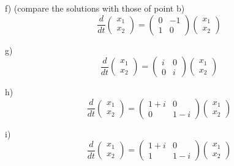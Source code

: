 f) (compare the solutions with those of point b)
\begin{equation}
  \label{eq:prob5_2f}
  \frac{d}{dt}\left(
    \begin{array}{c}
      x_1 \\ x_2
    \end{array}
  \right) = 
    \left(
      \begin{array}{cc}
        0 & -1 \\ 1 & 0
      \end{array}
    \right) \left(
      \begin{array}{c}
        x_1 \\ x_2
      \end{array}
      \right)
\end{equation}

g) 
\begin{equation}
  \label{eq:prob5_2g}
  \frac{d}{dt}\left(
    \begin{array}{c}
      x_1 \\ x_2
    \end{array}
  \right) = 
    \left(
      \begin{array}{cc}
        i & 0 \\ 0 & i
      \end{array}
    \right) \left(
      \begin{array}{c}
        x_1 \\ x_2
      \end{array}
      \right)
\end{equation}

h) 
\begin{equation}
  \label{eq:prob5_2h}
  \frac{d}{dt}\left(
    \begin{array}{c}
      x_1 \\ x_2
    \end{array}
  \right) = 
    \left(
      \begin{array}{cc}
        1+i & 0 \\ 0 & 1-i
      \end{array}
    \right) \left(
      \begin{array}{c}
        x_1 \\ x_2
      \end{array}
      \right)
\end{equation}

i) 
\begin{equation}
  \label{eq:prob5_2i}
  \frac{d}{dt}\left(
    \begin{array}{c}
      x_1 \\ x_2
    \end{array}
  \right) = 
    \left(
      \begin{array}{cc}
        1+i & 0 \\ 1 & 1-i
      \end{array}
    \right) \left(
      \begin{array}{c}
        x_1 \\ x_2
      \end{array}
      \right)
\end{equation}


